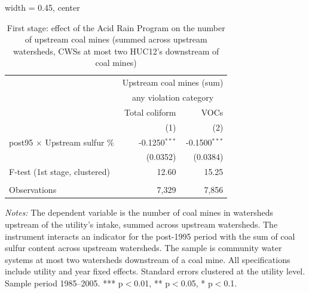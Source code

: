
\begin{table}[htbp]
   
   \caption{\label{tab:fs_dwnstrm2step_nonminevio_ivsum} First stage: effect of the Acid Rain Program on the number of upstream coal mines (summed across upstream watersheds, CWSs at most two HUC12's downstream of coal mines)}
   \bigskip
   
   \centering
   
   \begin{adjustbox}{width = 0.45\textwidth, center}
      
      
      \begin{tabular}{lrr}
         \toprule
         
          & \multicolumn{2}{c}{Upstream coal mines (sum)}\\
         
          & \multicolumn{2}{c}{any violation category} \\ 
                                              & Total coliform  & VOCs \\   
         
                                              & (1)             & (2)\\  
         
         \midrule 
         post95 $\times$ Upstream sulfur \%   & -0.1250$^{***}$ & -0.1500$^{***}$\\   
                                              & (0.0352)        & (0.0384)\\   
         
         F-test (1st stage, clustered)        & 12.60           & 15.25\\  
         
          \\
         
         Observations                         & 7,329           & 7,856\\  
         
         \bottomrule
         
      \end{tabular}
      
      
      
   \end{adjustbox}
      {\tiny\linespread{1}\selectfont \par \raggedright 
   \textit{Notes:} The dependent variable is the number of coal mines in watersheds upstream of the utility's intake, summed across upstream watersheds. The instrument interacts an indicator for the post-1995 period with the sum of coal sulfur content across upstream watersheds. The sample is community water systems at most two watersheds downstream of a coal mine. All specifications include utility and year fixed effects. Standard errors clustered at the utility level. Sample period 1985--2005. *** p$<$0.01, ** p$<$0.05, * p$<$0.1.}
   
\end{table}



